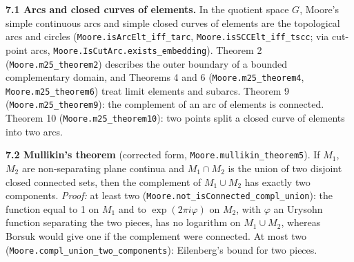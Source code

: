 \documentclass[11pt]{article}
\newcommand{\lean}[1]{\texttt{#1}}
\begin{document}
\textbf{7.1 Arcs and closed curves of elements.} In the quotient space $G$, Moore's simple continuous arcs and simple closed curves of elements are the topological arcs and circles (\lean{Moore.\hspace{0pt}isArcElt\_\hspace{0pt}iff\_\hspace{0pt}tarc}, \lean{Moore.\hspace{0pt}isSCCElt\_\hspace{0pt}iff\_\hspace{0pt}tscc}; via cut-point arcs, \lean{Moore.\hspace{0pt}IsCutArc.\hspace{0pt}exists\_\hspace{0pt}embedding}). Theorem 2 (\lean{Moore.\hspace{0pt}m25\_\hspace{0pt}theorem2}) describes the outer boundary of a bounded complementary domain, and Theorems 4 and 6 (\lean{Moore.\hspace{0pt}m25\_\hspace{0pt}theorem4}, \lean{Moore.\hspace{0pt}m25\_\hspace{0pt}theorem6}) treat limit elements and subarcs. Theorem 9 (\lean{Moore.\hspace{0pt}m25\_\hspace{0pt}theorem9}): the complement of an arc of elements is connected. Theorem 10 (\lean{Moore.\hspace{0pt}m25\_\hspace{0pt}theorem10}): two points split a closed curve of elements into two arcs.

\textbf{7.2 Mullikin's theorem} (corrected form, \lean{Moore.\hspace{0pt}mullikin\_\hspace{0pt}theorem5}). If $M_1$, $M_2$ are non-separating plane continua and $M_1 \cap M_2$ is the union of two disjoint closed connected sets, then the complement of $M_1 \cup M_2$ has exactly two components. \emph{Proof:} at least two (\lean{Moore.\hspace{0pt}not\_\hspace{0pt}isConnected\_\hspace{0pt}compl\_\hspace{0pt}union}): the function equal to 1 on $M_1$ and to $\exp (2\pi i\varphi)$ on $M_2$, with $\varphi$ an Urysohn function separating the two pieces, has no logarithm on $M_1 \cup M_2$, whereas Borsuk would give one if the complement were connected. At most two (\lean{Moore.\hspace{0pt}compl\_\hspace{0pt}union\_\hspace{0pt}two\_\hspace{0pt}components}): Eilenberg's bound for two pieces.
\end{document}
